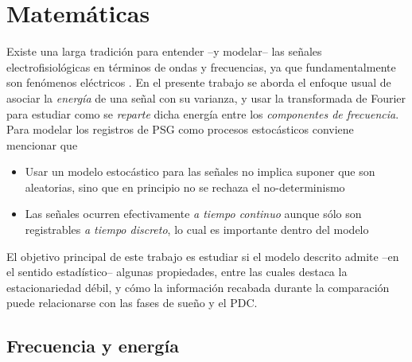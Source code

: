 
\section{Matemáticas}

Existe una larga tradición para entender --y modelar-- las señales electrofisiológicas en términos 
de ondas y frecuencias, ya que fundamentalmente son fenómenos eléctricos \cite{Kaiser00}.
En el presente trabajo se aborda el enfoque usual de asociar la \textit{energía} de una señal con 
su varianza, y usar la transformada de Fourier para estudiar como se \textit{reparte} dicha energía
entre los \textit{componentes de frecuencia}. 
%
Para modelar los registros de PSG como procesos estocásticos conviene mencionar que
\begin{itemize}
\item Usar un modelo estocástico para las señales no implica suponer que son aleatorias, sino que 
en principio no se rechaza el no-determinismo
\item Las señales ocurren efectivamente \textit{a tiempo continuo} aunque sólo son 
registrables \textit{a tiempo discreto}, lo cual es importante dentro del modelo
\end{itemize}

El objetivo principal de este trabajo es estudiar si el modelo descrito admite --en el sentido 
estadístico-- algunas propiedades, entre las cuales destaca la estacionariedad débil, y cómo la 
información recabada durante la comparación puede relacionarse con las fases de sueño y el PDC.


\subsection{Frecuencia y energía}


